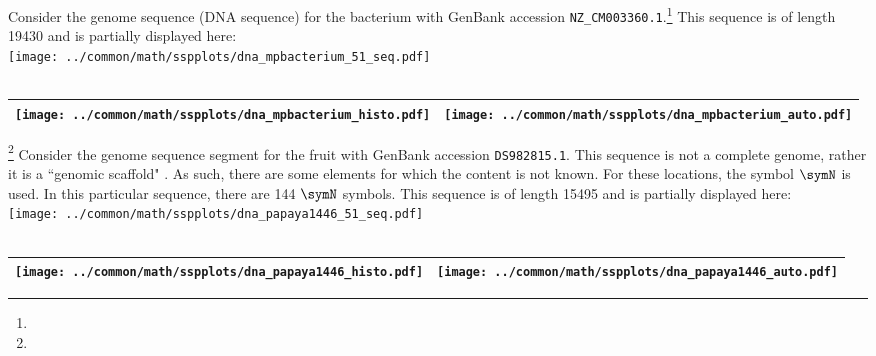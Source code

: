 \begin{example}
\label{ex:dna_mpbacterium}
Consider the genome sequence (DNA sequence) for the bacterium 
with GenBank accession \lstinline{NZ_CM003360.1}.\footnote{}
This sequence is of length 19430 and is partially displayed here:
  \\\texttt{[image: ../common/math/sspplots/dna\_mpbacterium\_51\_seq.pdf]}\\
     \\\begin{tabular}{|>{\scs}c|>{\scs}c|}
          \hline
          \texttt{[image: ../common/math/sspplots/dna\_mpbacterium\_histo.pdf]}%
         &\texttt{[image: ../common/math/sspplots/dna\_mpbacterium\_auto.pdf]}
        \\\hline
     \end{tabular}
\end{example}

\begin{example}
\footnote{
  }
\label{ex:dna_papaya}
Consider the genome sequence segment for the fruit
 with GenBank accession \lstinline{DS982815.1}.
This sequence is not a complete genome, rather it is a ``genomic scaffold" . 
As such, there are some elements for which the content is not known.
For these locations, the symbol $\symN$ is used.
In this particular sequence, there are 144 $\symN$ symbols.
This sequence is of length 15495 and is partially displayed here:
  \\\texttt{[image: ../common/math/sspplots/dna\_papaya1446\_51\_seq.pdf]}\\
     \\\begin{tabular}{|>{\scs}c|>{\scs}c|}
          \hline
          \texttt{[image: ../common/math/sspplots/dna\_papaya1446\_histo.pdf]}%
         &\texttt{[image: ../common/math/sspplots/dna\_papaya1446\_auto.pdf]}
        \\\hline
     \end{tabular}
\end{example}

